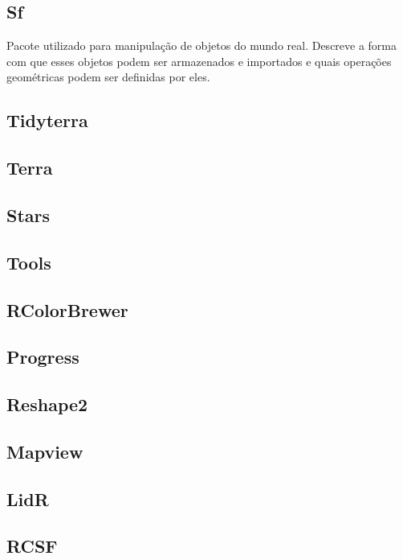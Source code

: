 \documentclass[
]{article}
\begin{document}
\subsection{Sf}\label{sf}

Pacote utilizado para manipulação de objetos do mundo real. Descreve a
forma com que esses objetos podem ser armazenados e importados e quais
operações geométricas podem ser definidas por eles.

\subsection{Tidyterra}\label{tidyterra}

\subsection{Terra}\label{terra}

\subsection{Stars}\label{stars}

\subsection{Tools}\label{tools}

\subsection{RColorBrewer}\label{rcolorbrewer}

\subsection{Progress}\label{progress}

\subsection{Reshape2}\label{reshape2}

\subsection{Mapview}\label{mapview}

\subsection{LidR}\label{lidr}

\subsection{RCSF}\label{rcsf}
\end{document}
